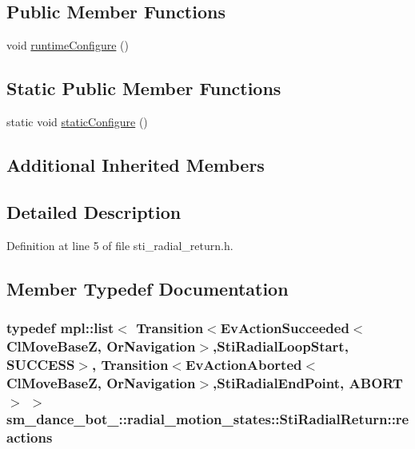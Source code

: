 \subsection*{Public Member Functions}
\begin{DoxyCompactItemize}
\item 
void \hyperlink{structsm__dance__bot__2_1_1radial__motion__states_1_1StiRadialReturn_ae991b48f5b623ca8de7f3e53f64b4e20}{runtime\+Configure} ()
\end{DoxyCompactItemize}
\subsection*{Static Public Member Functions}
\begin{DoxyCompactItemize}
\item 
static void \hyperlink{structsm__dance__bot__2_1_1radial__motion__states_1_1StiRadialReturn_aa9d5261dc9c96fa87b3c87a400ac0b65}{static\+Configure} ()
\end{DoxyCompactItemize}
\subsection*{Additional Inherited Members}


\subsection{Detailed Description}


Definition at line 5 of file sti\+\_\+radial\+\_\+return.\+h.



\subsection{Member Typedef Documentation}
\subsubsection[{\texorpdfstring{reactions}{reactions}}]{\setlength{\rightskip}{0pt plus 5cm}typedef mpl\+::list$<$ Transition$<$Ev\+Action\+Succeeded$<${\bf Cl\+Move\+BaseZ}, {\bf Or\+Navigation}$>$,{\bf Sti\+Radial\+Loop\+Start}, {\bf S\+U\+C\+C\+E\+SS}$>$, Transition$<$Ev\+Action\+Aborted$<${\bf Cl\+Move\+BaseZ}, {\bf Or\+Navigation}$>$,{\bf Sti\+Radial\+End\+Point}, {\bf A\+B\+O\+RT}$>$ $>$ {\bf sm\+\_\+dance\+\_\+bot\+\_\+::radial\+\_\+motion\+\_\+states\+::\+Sti\+Radial\+Return\+::reactions}}\hypertarget{structsm__dance__bot__2_1_1radial__motion__states_1_1StiRadialReturn_a3b589fd16dd6f3e94a30bdfb0f2c2064}{}\label{structsm__dance__bot__2_1_1radial__motion__states_1_1StiRadialReturn_a3b589fd16dd6f3e94a30bdfb0f2c2064}


